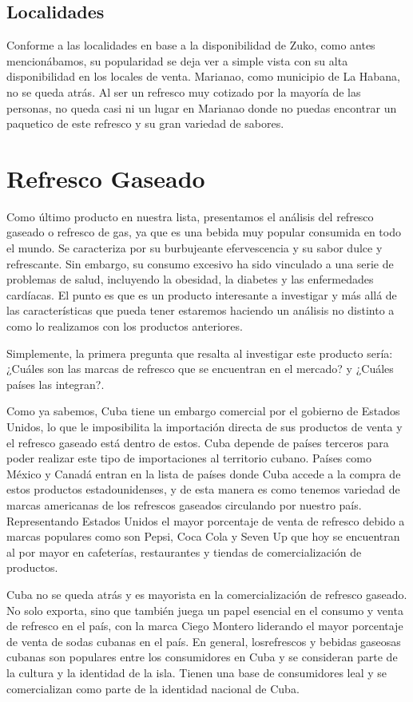 \documentclass[a4paper,12pt]{article}
\begin{document}
\subsection{Localidades}
Conforme a las localidades en base a la disponibilidad de Zuko, como antes mencionábamos, su popularidad se deja ver a simple vista con su alta disponibilidad en los locales de venta. 
Marianao, como municipio de La Habana, no se queda atrás. Al ser un refresco muy cotizado por la mayoría de las personas, no queda casi ni un lugar en Marianao donde no puedas encontrar un paquetico de este refresco y su gran variedad de sabores.

\section{Refresco Gaseado}
Como último producto en nuestra lista, presentamos el análisis del refresco gaseado o refresco de gas, ya que es una bebida muy popular consumida en todo el mundo. 
Se caracteriza por su burbujeante efervescencia y su sabor dulce y refrescante. Sin embargo, su consumo excesivo ha sido vinculado a una serie de problemas de salud, incluyendo la obesidad, la diabetes y las enfermedades cardíacas. 
El punto es que es un producto interesante a investigar y más allá de las características que pueda tener estaremos haciendo un análisis no distinto a como lo realizamos con los productos anteriores.

Simplemente, la primera pregunta que resalta al investigar este producto sería: ¿Cuáles son las marcas de refresco que se encuentran en el mercado? y ¿Cuáles países las integran?.

Como ya sabemos, Cuba tiene un embargo comercial por el gobierno de Estados Unidos, lo que le imposibilita la importación directa de sus productos de venta y el refresco gaseado está dentro de estos. 
Cuba depende de países terceros para poder realizar este tipo de importaciones al territorio cubano. 
Países como México y Canadá entran en la lista de países donde Cuba accede a la compra de estos productos estadounidenses, y de esta manera es como tenemos variedad de marcas americanas de los refrescos gaseados circulando por nuestro país. 
Representando Estados Unidos el mayor porcentaje de venta de refresco debido a marcas populares como son Pepsi, Coca Cola y Seven Up que hoy se encuentran al por mayor en cafeterías, restaurantes y tiendas de comercialización de productos.

Cuba no se queda atrás y es mayorista en la comercialización de refresco gaseado. No solo exporta, sino que también juega un papel esencial en el consumo y venta de refresco en el país, con la marca Ciego Montero liderando el mayor porcentaje de venta de sodas cubanas en el país. 
En general, losrefrescos y bebidas gaseosas cubanas son populares entre los consumidores en Cuba y se consideran parte de la cultura y la identidad de la isla. 
Tienen una base de consumidores leal y se comercializan como parte de la identidad nacional de Cuba.
\end{document}
